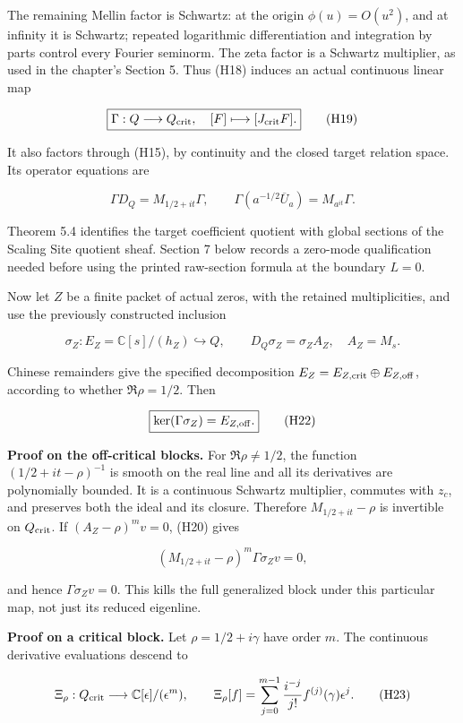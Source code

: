 The remaining Mellin factor is Schwartz: at the origin \(\phi(u)=O(u^2)\), and at infinity it is Schwartz; repeated logarithmic differentiation and integration by parts control every Fourier seminorm. The zeta factor is a Schwartz multiplier, as used in the chapter's Section 5. Thus (H18) induces an actual continuous linear map

\[
\boxed{\Gamma:Q\longrightarrow Q_{\rm crit},\quad [F]\longmapsto[J_{\rm crit}F].}
\tag{H19}
\]

It also factors through (H15), by continuity and the closed target relation space. Its operator equations are

\[
\Gamma D_Q=M_{1/2+it}\Gamma,\qquad
\Gamma(a^{-1/2}\overline U_a)=M_{a^{it}}\Gamma.
\tag{H20}
\]

Theorem 5.4 identifies the target coefficient quotient with global sections of the Scaling Site quotient sheaf. Section 7 below records a zero-mode qualification needed before using the printed raw-section formula at the boundary \(L=0\).

Now let \(Z\) be a finite packet of actual zeros, with the retained multiplicities, and use the previously constructed inclusion

\[
\sigma_Z:E_Z=\mathbb C[s]/(h_Z)\hookrightarrow Q,\qquad
D_Q\sigma_Z=\sigma_ZA_Z,\quad A_Z=M_s.
\tag{H21}
\]

Chinese remainders give the specified decomposition \(E_Z=E_{Z,\rm crit}\oplus E_{Z,\rm off}\), according to whether \(\Re\rho=1/2\). Then

\[
\boxed{\ker(\Gamma\sigma_Z)=E_{Z,\rm off}.}
\tag{H22}
\]

\textbf{Proof on the off-critical blocks.} For \(\Re\rho\ne1/2\), the function \((1/2+it-\rho)^{-1}\) is smooth on the real line and all its derivatives are polynomially bounded. It is a continuous Schwartz multiplier, commutes with \(z_c\), and preserves both the ideal and its closure. Therefore \(M_{1/2+it}-\rho\) is invertible on \(Q_{\rm crit}\). If \((A_Z-\rho)^m v=0\), (H20) gives

\[
(M_{1/2+it}-\rho)^m\Gamma\sigma_Zv=0,
\]

and hence \(\Gamma\sigma_Zv=0\). This kills the full generalized block under this particular map, not just its reduced eigenline.

\textbf{Proof on a critical block.} Let \(\rho=1/2+i\gamma\) have order \(m\). The continuous derivative evaluations descend to

\[
\Xi_\rho:Q_{\rm crit}\longrightarrow\mathbb C[\epsilon]/(\epsilon^m),\qquad
\Xi_\rho[f]=\sum_{j=0}^{m-1}\frac{i^{-j}}{j!}f^{(j)}(\gamma)\epsilon^j.
\tag{H23}
\]

